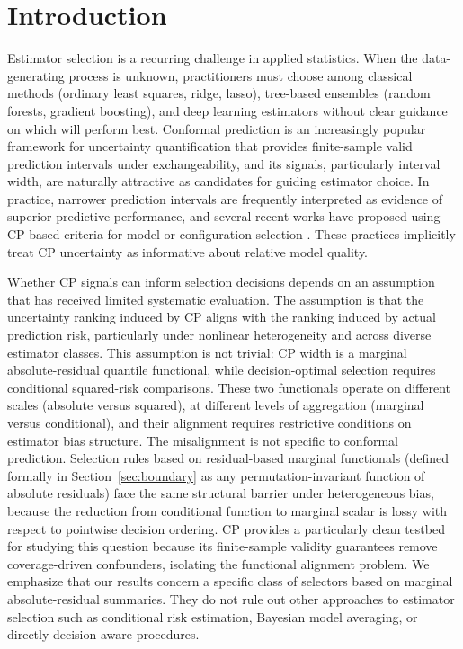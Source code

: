 \documentclass[pdflatex,sn-mathphys-ay]{sn-jnl}%
\theoremstyle{thmstyleone}%
\theoremstyle{thmstyletwo}%
\theoremstyle{thmstylethree}%
\begin{document}
\section{Introduction}
\label{sec:intro}

Estimator selection is a recurring challenge in applied statistics. When the data-generating process is unknown, practitioners must choose among classical methods (ordinary least squares, ridge, lasso), tree-based ensembles (random forests, gradient boosting), and deep learning estimators without clear guidance on which will perform best. Conformal prediction \citep[CP;][]{angelopoulos2023} is an increasingly popular framework for uncertainty quantification that provides finite-sample valid prediction intervals under exchangeability, and its signals, particularly interval width, are naturally attractive as candidates for guiding estimator choice. In practice, narrower prediction intervals are frequently interpreted as evidence of superior predictive performance, and several recent works have proposed using CP-based criteria for model or configuration selection \citep{yang2024conformal}. These practices implicitly treat CP uncertainty as informative about relative model quality.

Whether CP signals can inform selection decisions depends on an assumption that has received limited systematic evaluation. The assumption is that the uncertainty ranking induced by CP aligns with the ranking induced by actual prediction risk, particularly under nonlinear heterogeneity and across diverse estimator classes. This assumption is not trivial: CP width is a marginal absolute-residual quantile functional, while decision-optimal selection requires conditional squared-risk comparisons. These two functionals operate on different scales (absolute versus squared), at different levels of aggregation (marginal versus conditional), and their alignment requires restrictive conditions on estimator bias structure. The misalignment is not specific to conformal prediction. Selection rules based on residual-based marginal functionals (defined formally in Section~\ref{sec:boundary} as any permutation-invariant function of absolute residuals) face the same structural barrier under heterogeneous bias, because the reduction from conditional function to marginal scalar is lossy with respect to pointwise decision ordering. CP provides a particularly clean testbed for studying this question because its finite-sample validity guarantees remove coverage-driven confounders, isolating the functional alignment problem. We emphasize that our results concern a specific class of selectors based on marginal absolute-residual summaries. They do not rule out other approaches to estimator selection such as conditional risk estimation, Bayesian model averaging, or directly decision-aware procedures.
\end{document}
